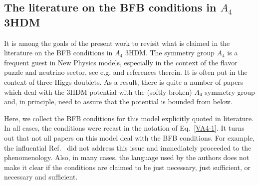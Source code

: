 \documentclass[11pt]{article}
\begin{document}
\subsection{The literature on the BFB conditions in $A_4$ 3HDM} \label{literature_conditions}

It is among the goals of the present work to revisit what is claimed in the literature on the BFB conditions in $A_4$ 3HDM.
The symmetry group $A_4$ is a frequent guest in New Physics models, especially in the context of the flavor puzzle
and neutrino sector, see e.g. \cite{Ishimori:2010au,King:2013eh} and references therein. 
It is often put in the context of three Higgs doublets.
As a result, there is quite a number of papers which deal with the 3HDM potential with the (softly broken) $A_4$ symmetry group
and, in principle, need to assure that the potential is bounded from below. 

Here, we collect the BFB conditions for this model explicitly quoted in literature. 
In all cases, the conditions were recast in the notation of Eq.~\eqref{VA4-1}.
It turns out that not all papers on this model deal with the BFB conditions.
For example, the influential Ref.~\cite{Ma:2001dn} did not address this issue and immediately proceeded to the phenomenology.
Also, in many cases, the language used by the authors does not make it clear if the conditions are claimed to be just necessary, just sufficient, 
or necessary and sufficient. 
\end{document}
